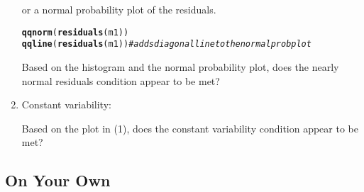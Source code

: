 \documentclass{article}\usepackage[]{graphicx}\usepackage[]{color}
\makeatletter
\newcommand{\hlcom}[1]{\textcolor[rgb]{0.678,0.584,0.686}{\textit{#1}}}%
\newcommand{\hlstd}[1]{\textcolor[rgb]{0.345,0.345,0.345}{#1}}%
\newcommand{\hlkwd}[1]{\textcolor[rgb]{0.737,0.353,0.396}{\textbf{#1}}}%
\newenvironment{kframe}{%
 \def\at@end@of@kframe{}%
 \ifinner\ifhmode%
  \def\at@end@of@kframe{\end{minipage}}%
  \begin{minipage}{\columnwidth}%
 \fi\fi%
 \def\FrameCommand##1{\hskip\@totalleftmargin \hskip-\fboxsep
 \colorbox{shadecolor}{##1}\hskip-\fboxsep
     \hskip-\linewidth \hskip-\@totalleftmargin \hskip\columnwidth}%
 \MakeFramed {\advance\hsize-\width
   \@totalleftmargin\z@ \linewidth\hsize
   \@setminipage}}%
 {\par\unskip\endMakeFramed%
 \at@end@of@kframe}
\newenvironment{knitrout}{}{} %
\makeatother
\begin{document}
\begin{enumerate}[(1)]
or a normal probability plot of the residuals.

\begin{knitrout}
\color{fgcolor}\begin{kframe}
\begin{alltt}
\hlkwd{qqnorm}\hlstd{(}\hlkwd{residuals}\hlstd{(m1))}
\hlkwd{qqline}\hlstd{(}\hlkwd{residuals}\hlstd{(m1))}  \hlcom{# adds diagonal line to the normal prob plot}
\end{alltt}
\end{kframe}
\end{knitrout}


\begin{exercise}
Based on the histogram and the normal probability plot, does the nearly normal residuals condition appear to be met?
\end{exercise}

\item Constant variability:

\begin{exercise}
Based on the plot in (1), does the constant variability condition appear to be met? 
\end{exercise}

\end{enumerate}

%

\vspace{2cm}

\subsection*{On Your Own}
\end{document}
